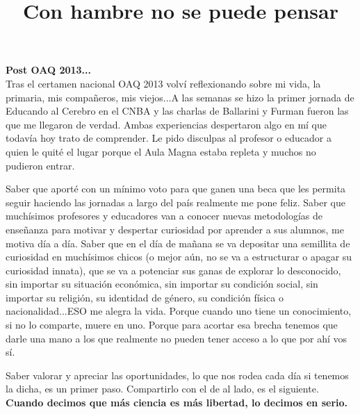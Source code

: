 \documentclass[12t, a4 paper]{article}
\title{Con hambre no se puede pensar }
\date{}
\begin{document}
\maketitle
\textbf{Post OAQ 2013...} \\

Tras el certamen nacional OAQ 2013 volví reflexionando sobre mi vida, la primaria, mis compañeros, mis viejos...A las semanas se hizo la primer jornada de Educando al Cerebro en el CNBA y las charlas de Ballarini y Furman fueron las que me llegaron de verdad. Ambas experiencias despertaron algo en mí que todavía hoy trato de comprender. Le pido disculpas al profesor o educador a quien le quité el lugar porque el Aula Magna estaba repleta y muchos no pudieron entrar. 

    Saber que aporté con un mínimo voto para que ganen una beca que les permita seguir haciendo las jornadas a largo del país realmente me pone feliz. Saber que muchísimos profesores y educadores van a conocer nuevas metodologías de enseñanza para motivar y despertar curiosidad por aprender a sus alumnos, me motiva día a día. Saber que en el día de mañana se va depositar una semillita de curiosidad en muchísimos chicos (o mejor aún, no se va a estructurar o apagar su curiosidad innata), que se va a potenciar sus ganas de explorar lo desconocido, sin importar su situación económica, sin importar su condición social, sin importar su religión, su identidad de género, su condición física o nacionalidad...ESO me alegra la vida. Porque cuando uno tiene un conocimiento, si no lo comparte, muere en uno. Porque para acortar esa brecha tenemos que darle una mano a los que realmente no pueden tener acceso a lo que por ahí vos sí. 

    Saber valorar y apreciar las oportunidades, lo que nos rodea cada día si tenemos la dicha, es un primer paso. Compartirlo con el de al lado, es el siguiente.  \\

 
  \textbf{ Cuando decimos que más ciencia es más libertad, lo decimos en serio. }
   
\end{document}
